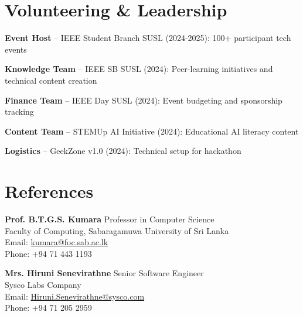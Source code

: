 \documentclass[letterpaper,10pt]{article}
\newenvironment{resume_list}{
  \vspace{-1pt}
  \begin{itemize}[itemsep=2pt, leftmargin=14pt]
}{
  \end{itemize}\vspace{-2pt}
}
\begin{document}
\section{Volunteering \& Leadership}
\vspace{-1pt}
\begin{resume_list}
  \item \textbf{Event Host} – IEEE Student Branch SUSL (2024-2025): 100+ participant tech events
  \item \textbf{Knowledge Team} – IEEE SB SUSL (2024): Peer-learning initiatives and technical content creation
  \item \textbf{Finance Team} – IEEE Day SUSL (2024): Event budgeting and sponsorship tracking
  \item \textbf{Content Team} – STEMUp AI Initiative (2024): Educational AI literacy content
  \item \textbf{Logistics} – GeekZone v1.0 (2024): Technical setup for hackathon
\end{resume_list}

\vspace{-2pt}
\section{References}
\vspace{-1pt}

\noindent\textbf{Prof. B.T.G.S. Kumara} \hfill Professor in Computer Science\\
\noindent Faculty of Computing, Sabaragamuwa University of Sri Lanka\\
\noindent Email: \href{mailto:kumara@foc.sab.ac.lk}{kumara@foc.sab.ac.lk}\\
\noindent Phone: +94 71 443 1193

\vspace{3pt}
\noindent\textbf{Mrs. Hiruni Senevirathne} \hfill Senior Software Engineer\\
\noindent Sysco Labs Company\\
\noindent Email: \href{mailto:Hiruni.Senevirathne@sysco.com}{Hiruni.Senevirathne@sysco.com}\\
\noindent Phone: +94 71 205 2959
\end{document}
